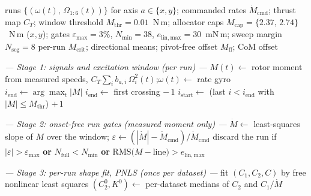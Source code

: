 
\begin{algorithm}[t]
\caption{Pre-flight critical-moment identification with the constrained
cosh family}
\label{alg:identification}
\begin{algorithmic}[1]
\Require runs $\{(\omega(t),\,\Omega_{1:6}(t))\}$ for axis
  $a \in \{x,y\}$; commanded rates $\dot M_{\mathrm{cmd}}$;
  thrust map $C_T$; window threshold $M_{\mathrm{thr}} = 0.01$~N\,m;
  allocator caps $M_{\mathrm{cap}} = \{2.37,\,2.74\}$~N\,m ($x,y$);
  gates $\varepsilon_{\max} = 3\%$, $N_{\min} = 38$,
  $e_{\mathrm{lin,max}} = 30$~mN\,m;
  sweep margin $N_{\mathrm{seg}} = 8$
\Ensure per-run $M_{\mathrm{crit}}$; directional means; pivot-free
  offset $M_{\mathrm{ff}}$; CoM offset

\Statex \textit{— Stage 1: signals and excitation window (per run) —}
\State $M(t) \gets$ rotor moment from measured speeds,
  $C_T\sum_i b_{a,i}\,\Omega_i^2(t)$;\quad $\omega(t) \gets$ rate gyro
\State $i_{\mathrm{end}} \gets \arg\max_t |M|$
  \State $i_{\mathrm{end}} \gets$ first crossing $-\,1$
\EndIf
\State $i_{\mathrm{start}} \gets$ (last $i < i_{\mathrm{end}}$ with
  $|M| \le M_{\mathrm{thr}}$) $+\,1$

\Statex \textit{— Stage 2: onset-free run gates (measured moment only) —}
\State $\dot M \gets$ least-squares slope of $M$ over the window;\quad
  $\varepsilon \gets (|\dot M| - \dot M_{\mathrm{cmd}})
  / \dot M_{\mathrm{cmd}}$
\State discard the run if $|\varepsilon| > \varepsilon_{\max}$
  \textbf{or} $N_{\mathrm{full}} < N_{\min}$ \textbf{or}
  $\mathrm{RMS}\bigl(M - \mathrm{line}\bigr) > e_{\mathrm{lin,max}}$

\Statex \textit{— Stage 3: per-run shape fit, PNLS (once per dataset) —}
  \State fit $(C_1, C_2, C)$ by free nonlinear least squares
\EndFor
\State $(C_2^{0}, K^{0}) \gets$ per-dataset medians of $C_2$ and
  $C_1/\dot M$


\end{algorithmic}
\end{algorithm}
